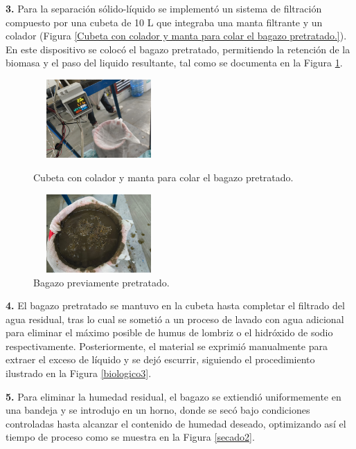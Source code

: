 \documentclass[12pt]{article}
\begin{document}
			
			\textbf{3.} Para la separación sólido-líquido se implementó un sistema de filtración compuesto por una cubeta de 10 L que integraba una manta filtrante y un colador (Figura \ref{Cubeta con colador y manta para colar el bagazo pretratado.}). En este dispositivo se colocó el bagazo pretratado, permitiendo la retención de la biomasa y el paso del liquido resultante, tal como se documenta en la Figura \ref{Bagazo1}.
 
				\begin{figure}[H]
				\centering
				\begin{minipage}{0.46\textwidth}
					\centering
					\includegraphics[width=5cm, height=3cm]{imagenes/biologico6} %
					\caption{Cubeta con colador y manta para colar el bagazo pretratado.}
					\label{Cubeta con colador y manta para colar el bagazo pretratado.}
				\end{minipage}
				\hfill
				\begin{minipage}{0.48\textwidth}
					\centering
					\includegraphics[width=5cm, height=3cm]{imagenes/bagazo_biologico_sacado} %
					\caption{Bagazo previamente pretratado.}
					\label{Bagazo1}
				\end{minipage}
			\end{figure}
	
	     \textbf{4.} El bagazo pretratado se mantuvo en la cubeta hasta completar el filtrado del agua residual, tras lo cual se sometió a un proceso de lavado con agua adicional para eliminar el máximo posible de humus de lombriz o el hidróxido de sodio respectivamente. Posteriormente, el material se exprimió manualmente para extraer el exceso de líquido y se dejó escurrir, siguiendo el procedimiento ilustrado en la Figura \ref{biologico3}.
	     
	
	\textbf{5.} Para eliminar la humedad residual, el bagazo se extiendió uniformemente en una bandeja y se introdujo en un horno, donde se secó bajo condiciones controladas hasta alcanzar el contenido de humedad deseado, optimizando así el tiempo de proceso como se muestra en la Figura \ref{secado2}. 
	
\end{document}

